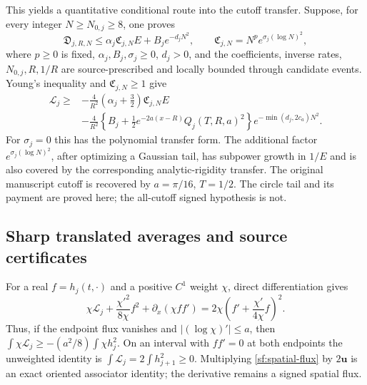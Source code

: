 \documentclass[11pt]{article}
\numberwithin{equation}{section}
\theoremstyle{definition}
\theoremstyle{remark}
\newcommand{\Lag}{\mathcal L}
\begin{document}
This yields a quantitative conditional route into the cutoff transfer.
Suppose, for every integer \(N\ge N_{0,j}\ge8\), one proves
\[
 \mathfrak D_{j,R,N}\le
 \alpha_j\mathfrak C_{j,N}E+B_je^{-d_jN^2},\qquad
 \mathfrak C_{j,N}=N^pe^{\sigma_j(\log N)^2},
\]
where \(p\ge0\) is fixed, \(\alpha_j,B_j,\sigma_j\ge0\), \(d_j>0\),
and the coefficients, inverse rates, \(N_{0,j},R,1/R\) are
source-prescribed and locally bounded through candidate events.
Young's inequality and \(\mathfrak C_{j,N}\ge1\) give
\begin{equation}
 \begin{split}
 \Lag_j\ge{}&
 -\frac4{R^2}(\alpha_j+\tfrac32)\mathfrak C_{j,N}E\\
 &-\frac4{R^2}\left\{B_j+
             \tfrac12e^{-2a(x-R)}Q_j(T,R,a)^2\right\}
                         e^{-\min(d_j,2c_a)N^2}.
 \end{split}
 \label{sf:conditional-boundary-cutoff}
\end{equation}
For \(\sigma_j=0\) this has the polynomial transfer form.
The additional factor \(e^{\sigma_j(\log N)^2}\), after optimizing
a Gaussian tail, has subpower growth in \(1/E\) and is also covered
by the corresponding analytic-rigidity transfer.  The original
manuscript cutoff is recovered by \(a=\pi/16\), \(T=1/2\).
The circle tail and its payment are proved here; the all-cutoff signed
hypothesis is not.

\subsection{Sharp translated averages and source certificates}

For a real \(f=h_j(t,\cdot)\) and a positive \(C^1\) weight \(\chi\),
direct differentiation gives
\begin{equation}
 \chi\Lag_j+\frac{\chi'^2}{8\chi}f^2+
       \partial_x(\chi ff')
 =2\chi\left(f'+\frac{\chi'}{4\chi}f\right)^2.
 \label{sf:spatial-flux}
\end{equation}
Thus, if the endpoint flux vanishes and
\(|(\log\chi)'|\le a\), then
\(\int\chi\Lag_j\ge-(a^2/8)\int\chi h_j^2\).
On an interval with \(ff'=0\) at both endpoints the unweighted
identity is \(\int\Lag_j=2\int h_{j+1}^2\ge0\).
Multiplying \eqref{sf:spatial-flux} by \(2\mathbf u\) is an exact
oriented associator identity; the derivative remains a signed
spatial flux.
\end{document}
